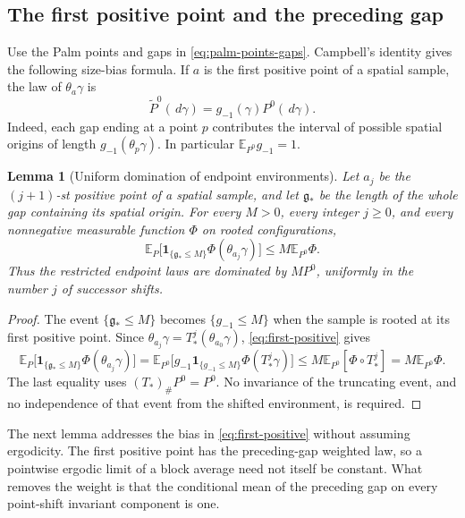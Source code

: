 \documentclass[11pt,reqno]{amsart}
\numberwithin{equation}{section}
\newtheorem{lemma}[theorem]{Lemma}
\theoremstyle{definition}
\theoremstyle{remark}
\newcommand{\E}{\mathbb E}
\newcommand{\1}{\mathbf 1}
\newcommand{\dd}{\,d}
\newcommand{\gap}{\mathfrak g}
\begin{document}
\subsection{The first positive point and the preceding gap}

Use the Palm points and gaps in \eqref{eq:palm-points-gaps}.
Campbell's identity gives the following size-bias formula. If $a$ is the first positive point of a spatial sample, the law
of $\theta_a\gamma$ is
\begin{equation}\label{eq:first-positive}
\widetilde P^0(\dd\gamma)=g_{-1}(\gamma)P^0(\dd\gamma).
\end{equation}
Indeed, each gap ending at a point $p$ contributes the interval of
possible spatial origins of length $g_{-1}(\theta_p\gamma)$.
In particular $\E_{P^0}g_{-1}=1$.

\begin{samepage}
\begin{lemma}[Uniform domination of endpoint environments]
\label{lem:endpoint-domination}
Let $a_j$ be the $(j+1)$-st positive point of a spatial sample, and let
$\gap_*$ be the length of the whole gap containing its spatial origin.
For every $M>0$, every integer $j\ge0$, and every nonnegative measurable
function $\Phi$ on rooted configurations,
\begin{equation}\label{eq:endpoint-domination}
\E_P\bigl[\1_{\{\gap_*\le M\}}\Phi(\theta_{a_j}\gamma)\bigr]
\le M\E_{P^0}\Phi.
\end{equation}
Thus the restricted endpoint laws are dominated by $MP^0$, uniformly
in the number $j$ of successor shifts.
\end{lemma}
\end{samepage}

\begin{proof}
The event $\{\gap_*\le M\}$ becomes $\{g_{-1}\le M\}$ when the sample
is rooted at its first positive point. Since
$\theta_{a_j}\gamma=T_*^j(\theta_{a_0}\gamma)$,
\eqref{eq:first-positive} gives
\[
\E_P\bigl[\1_{\{\gap_*\le M\}}\Phi(\theta_{a_j}\gamma)\bigr]
=\E_{P^0}\bigl[g_{-1}\1_{\{g_{-1}\le M\}}
                    \Phi(T_*^j\gamma)\bigr]
\le M\E_{P^0}[\Phi\circ T_*^j]
=M\E_{P^0}\Phi.
\]
The last equality uses $(T_*)_\#P^0=P^0$. No invariance of the
truncating event, and no independence of that event from the shifted
environment, is required.
\end{proof}

The next lemma addresses the bias in \eqref{eq:first-positive} without
assuming ergodicity. The first positive point has the preceding-gap
weighted law, so a pointwise ergodic limit of a block average need not
itself be constant. What removes the weight is that the conditional
mean of the preceding gap on every point-shift invariant component is
one.
\end{document}
